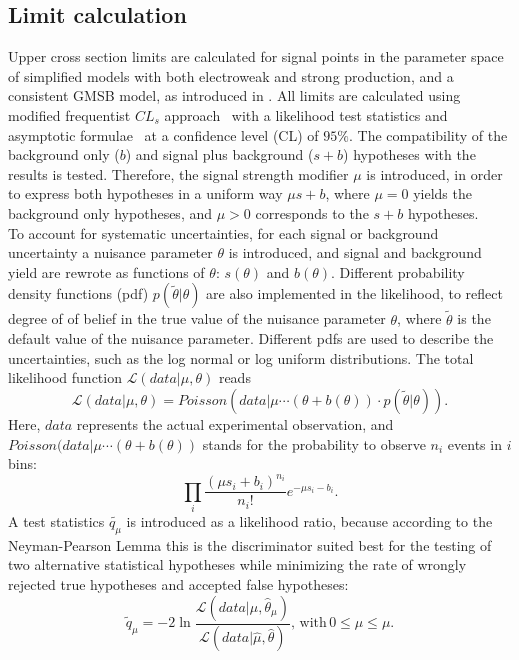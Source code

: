 \subsection{Limit calculation}
Upper cross section limits are calculated for signal points in the parameter space of simplified models with both electroweak and strong production, and a consistent GMSB model, as introduced in . All limits are calculated using modified frequentist $CL_s$ approach~\cite{CLS1,CLS2,CLS3} with a likelihood test statistics and asymptotic formulae~\cite{AsymptoticFormulae} at a confidence level (CL) of $95\%$. The compatibility of the background only ($b$) and signal plus background ($s+b$) hypotheses with the results is tested. Therefore, the signal strength modifier $\mu$ is introduced, in order to express both hypotheses in a uniform way $\mu s+b$, where $\mu=0$ yields the background only hypotheses, and $\mu>0$ corresponds to the $s+b$ hypotheses.\\
To account for systematic uncertainties, for each signal or background uncertainty a nuisance parameter $\theta$ is introduced, and signal and background yield are rewrote as functions of $\theta$: $s(\theta)$ and $b(\theta)$. Different probability density functions (pdf) $p(\tilde{\theta}|\theta)$ are also implemented in the likelihood, to reflect degree of of belief in the true value of the nuisance parameter $\theta$, where $\tilde{\theta}$ is the default value of the nuisance parameter. Different pdfs are used to describe the uncertainties, such as the log normal or log uniform distributions. The total likelihood function $\mathcal{L}(data|\mu,\theta)$ reads
\begin{equation}
 \mathcal{L}(data|\mu,\theta)= Poisson(data|\mu\cdots(\theta+b(\theta))\cdot p(\tilde{\theta}|\theta)).
\end{equation}
Here, $data$ represents the actual experimental observation, and $Poisson(data|\mu\cdots(\theta+b(\theta))$ stands for the probability to observe $n_i$ events in $i$ bins:
\begin{equation}
 \prod_i \frac{(\mu s_i+b_i)^{n_i}}{n_i!}e^{-\mu s_i - b_i}.
\end{equation}
A test statistics $\tilde{q_\mu}$ is introduced as a likelihood ratio, because according to the Neyman-Pearson Lemma this is the discriminator suited best for the testing of two alternative statistical hypotheses while minimizing the rate of wrongly rejected true hypotheses and accepted false hypotheses:
\begin{equation}
 \tilde{q}_{\mu}= -2 \ln \frac{\mathcal{L}(data|\mu,\hat{\theta}_{\mu})}{\mathcal{L}(data|\hat{\mu},\hat{\theta})}, \,\mathrm{with}\,0\leq\hat{\mu}\leq\mu.
\end{equation}
